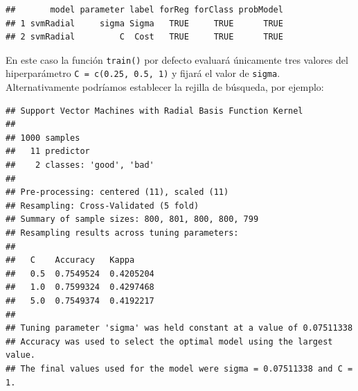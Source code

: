\documentclass[
]{book}
\newenvironment{Shaded}{\begin{snugshade}}{\end{snugshade}}
\newcommand{\CommentTok}[1]{\textcolor[rgb]{0.56,0.35,0.01}{\textit{#1}}}
\newcommand{\DataTypeTok}[1]{\textcolor[rgb]{0.13,0.29,0.53}{#1}}
\newcommand{\DecValTok}[1]{\textcolor[rgb]{0.00,0.00,0.81}{#1}}
\newcommand{\FloatTok}[1]{\textcolor[rgb]{0.00,0.00,0.81}{#1}}
\newcommand{\KeywordTok}[1]{\textcolor[rgb]{0.13,0.29,0.53}{\textbf{#1}}}
\newcommand{\NormalTok}[1]{#1}
\newcommand{\OperatorTok}[1]{\textcolor[rgb]{0.81,0.36,0.00}{\textbf{#1}}}
\newcommand{\OtherTok}[1]{\textcolor[rgb]{0.56,0.35,0.01}{#1}}
\newcommand{\StringTok}[1]{\textcolor[rgb]{0.31,0.60,0.02}{#1}}
\theoremstyle{break}
\theoremstyle{definition}
\theoremstyle{definition}
\theoremstyle{definition}
\theoremstyle{remark}
\begin{document}
\begin{verbatim}
##       model parameter label forReg forClass probModel
## 1 svmRadial     sigma Sigma   TRUE     TRUE      TRUE
## 2 svmRadial         C  Cost   TRUE     TRUE      TRUE
\end{verbatim}

En este caso la función \texttt{train()} por defecto evaluará únicamente tres valores del hiperparámetro \texttt{C\ =\ c(0.25,\ 0.5,\ 1)} y fijará el valor de \texttt{sigma}.
Alternativamente podríamos establecer la rejilla de búsqueda, por ejemplo:

\begin{Shaded}
\end{Shaded}

\begin{verbatim}
## Support Vector Machines with Radial Basis Function Kernel 
## 
## 1000 samples
##   11 predictor
##    2 classes: 'good', 'bad' 
## 
## Pre-processing: centered (11), scaled (11) 
## Resampling: Cross-Validated (5 fold) 
## Summary of sample sizes: 800, 801, 800, 800, 799 
## Resampling results across tuning parameters:
## 
##   C    Accuracy   Kappa    
##   0.5  0.7549524  0.4205204
##   1.0  0.7599324  0.4297468
##   5.0  0.7549374  0.4192217
## 
## Tuning parameter 'sigma' was held constant at a value of 0.07511338
## Accuracy was used to select the optimal model using the largest value.
## The final values used for the model were sigma = 0.07511338 and C = 1.
\end{verbatim}
\end{document}
